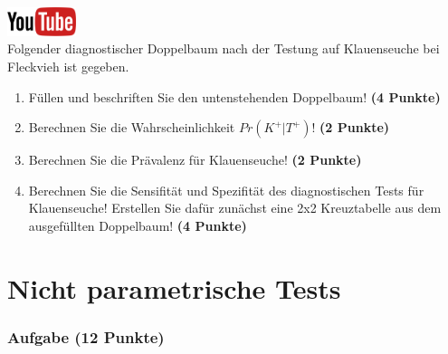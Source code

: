 \documentclass[a4paper, 9pt]{scrartcl}\usepackage[]{graphicx}\usepackage[]{xcolor}
\begin{document}
\hfill\href{https://youtu.be/_7s44pbOc00}{\includegraphics[width =
  2cm]{img/youtube}}\\[1Ex]





Folgender diagnostischer Doppelbaum nach der Testung auf Klauenseuche bei
Fleckvieh ist gegeben.

\begin{enumerate}
\item F{\"u}llen und beschriften Sie den untenstehenden Doppelbaum! \textbf{(4
    Punkte)}
\item Berechnen Sie die Wahrscheinlichkeit $Pr(K^+|T^+)$! \textbf{(2 Punkte)}
\item Berechnen Sie die Pr{\"a}valenz f{\"u}r Klauenseuche! \textbf{(2 Punkte)}
\item Berechnen Sie die Sensifit{\"a}t und Spezifit{\"a}t des diagnostischen Tests
  f{\"u}r Klauenseuche! Erstellen Sie daf{\"u}r zun{\"a}chst eine 2x2 Kreuztabelle aus
  dem ausgef{\"u}llten Doppelbaum!
  \textbf{(4 Punkte)}
\end{enumerate}

\vspace{1cm}
 




 
\clearpage
\part{Nicht parametrische Tests}

\section{Aufgabe \hfill (12 Punkte)}
\end{document}
